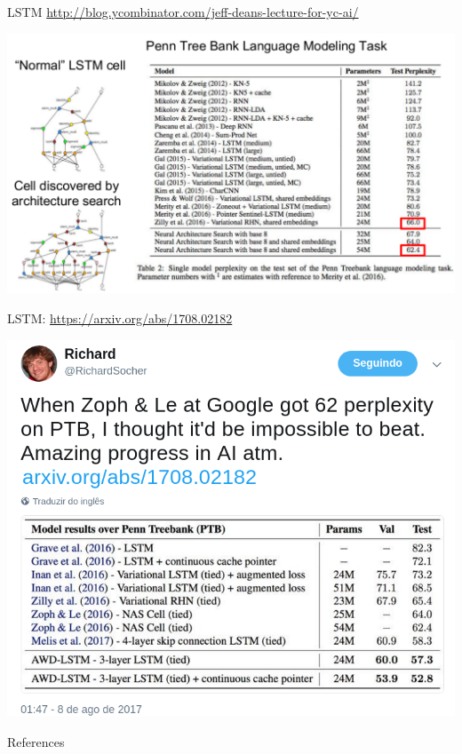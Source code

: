 \documentclass[10pt]{beamer}
\begin{document}
\begin{frame}{LSTM}
\url{http://blog.ycombinator.com/jeff-deans-lecture-for-yc-ai/}

\begin{center}
\includegraphics[scale=0.45]{images/JeffDeanLectureforYCAI.pdf}
\end{center}
\nocite{DeepLearningbook}

\end{frame}


\begin{frame}{LSTM: \url{https://arxiv.org/abs/1708.02182}}

\begin{center}
\includegraphics[scale=0.34]{images/SocherPTB.png}
\end{center}

\end{frame}


\begin{frame}[allowframebreaks]{References}

  
  

\end{frame}
\end{document}
